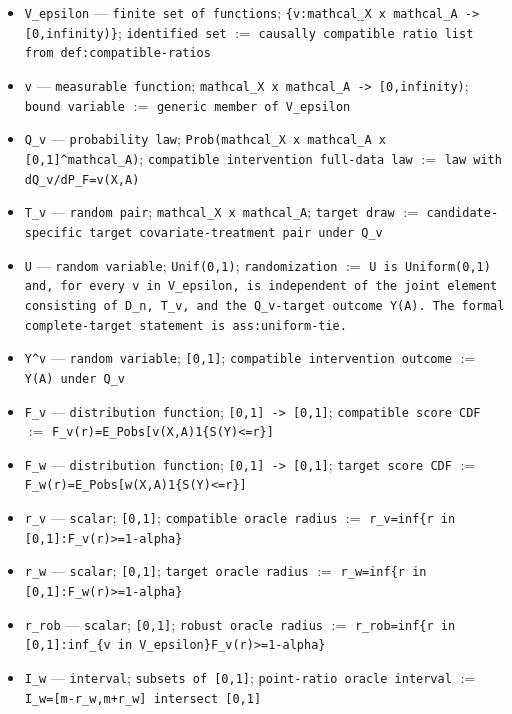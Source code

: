 \documentclass{article}
\begin{document}
\begin{itemize}
  \item \texttt{V\_epsilon} --- \texttt{finite set of functions}; \texttt{\{v:mathcal\_X x mathcal\_A -> [0,infinity)\}}; \texttt{identified set} $:=$ \texttt{causally compatible ratio list from def:compatible-ratios}
  \item \texttt{v} --- \texttt{measurable function}; \texttt{mathcal\_X x mathcal\_A -> [0,infinity)}; \texttt{bound variable} $:=$ \texttt{generic member of V\_epsilon}
  \item \texttt{Q\_v} --- \texttt{probability law}; \texttt{Prob(mathcal\_X x mathcal\_A x [0,1]\textasciicircum{}mathcal\_A)}; \texttt{compatible intervention full-data law} $:=$ \texttt{law with dQ\_v/dP\_F=v(X,A)}
  \item \texttt{T\_v} --- \texttt{random pair}; \texttt{mathcal\_X x mathcal\_A}; \texttt{target draw} $:=$ \texttt{candidate-specific target covariate-treatment pair under Q\_v}
  \item \texttt{U} --- \texttt{random variable}; \texttt{Unif(0,1)}; \texttt{randomization} $:=$ \texttt{U is Uniform(0,1) and, for every v in V\_epsilon, is independent of the joint element consisting of D\_n, T\_v, and the Q\_v-target outcome Y(A). The formal complete-target statement is ass:uniform-tie.}
  \item \texttt{Y\textasciicircum{}v} --- \texttt{random variable}; \texttt{[0,1]}; \texttt{compatible intervention outcome} $:=$ \texttt{Y(A) under Q\_v}
  \item \texttt{F\_v} --- \texttt{distribution function}; \texttt{[0,1] -> [0,1]}; \texttt{compatible score CDF} $:=$ \texttt{F\_v(r)=E\_Pobs[v(X,A)1\{S(Y)<=r\}]}
  \item \texttt{F\_w} --- \texttt{distribution function}; \texttt{[0,1] -> [0,1]}; \texttt{target score CDF} $:=$ \texttt{F\_w(r)=E\_Pobs[w(X,A)1\{S(Y)<=r\}]}
  \item \texttt{r\_v} --- \texttt{scalar}; \texttt{[0,1]}; \texttt{compatible oracle radius} $:=$ \texttt{r\_v=inf\{r in [0,1]:F\_v(r)>=1-alpha\}}
  \item \texttt{r\_w} --- \texttt{scalar}; \texttt{[0,1]}; \texttt{target oracle radius} $:=$ \texttt{r\_w=inf\{r in [0,1]:F\_w(r)>=1-alpha\}}
  \item \texttt{r\_rob} --- \texttt{scalar}; \texttt{[0,1]}; \texttt{robust oracle radius} $:=$ \texttt{r\_rob=inf\{r in [0,1]:inf\_\{v in V\_epsilon\}F\_v(r)>=1-alpha\}}
  \item \texttt{I\_w} --- \texttt{interval}; \texttt{subsets of [0,1]}; \texttt{point-ratio oracle interval} $:=$ \texttt{I\_w=[m-r\_w,m+r\_w] intersect [0,1]}

\end{itemize}
\end{document}
